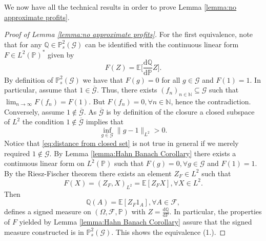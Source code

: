 \documentclass[11pt,a4paper,twoside,openany]{report}
\numberwithin{equation}{section}
\newcommand{\diff}{\mathrm{d}}
\theoremstyle{plain} %
\theoremstyle{definition} %
\theoremstyle{remark} %
\begin{document}
We now have all the technical results in order to prove Lemma \ref{lemma:no approximate profits}.
\begin{proof}[Proof of Lemma \ref{lemma:no approximate profits}]
For the first equivalence, note that for any \(\mathbb{Q}\in\mathbb{P}_s^2(\mathcal{G})\) can be identified with the continuous linear form \(F\in L^2(\mathbb{P})^*\) given by 
\begin{equation*}
    F(Z)=\mathbb{E}\Big[\frac{\diff\mathbb{Q}}{\diff\mathbb{P}}Z\Big].
\end{equation*}
By definition of \(\mathbb{P}_s^2(\mathcal{G})\) we have that \(F(g)=0\) for all \(g\in\mathcal{G}\) and \(F(1)=1\). In particular,  assume that \(1\in\overline{\mathcal{G}}\). Thus, there exists \((f_n)_{n\in\mathbb{N}}\subseteq\mathcal{G}\) such that \(\lim_{n\to\infty}F(f_n)=F(1)\). But \(F(f_n)=0,\forall n\in\mathbb{N}\), hence the contradiction. Conversely, assume \(1\notin\overline{\mathcal{G}}\). As \(\overline{\mathcal{G}}\) is by definition of the closure a closed subspace of \(L^2\) the condition
\(1\notin\overline{\mathcal{G}}\) implies that 
\begin{equation}\label{eq:distance from closed set}
    \inf_{g\in\mathcal{G}}\lVert g-1\rVert_{L^2}>0.
\end{equation}
Notice that \eqref{eq:distance from closed set} is not true in general if we merely required \(1\notin\mathcal{G}\).
By Lemma \ref{lemma:Hahn Banach Corollary} there exists a continuous linear form on \(L^2(\mathbb{P})\) such that \(F(g)=0,\forall g\in\mathcal{G}\) and  \(F(1)=1\). By the Riesz-Fischer theorem there exists an element \(Z_F\in L^2\) such that
\begin{equation*}
    F(X)=(Z_F,X)_{L^2}=\mathbb{E}[Z_FX],\forall X\in L^2.
\end{equation*}
Then 
\begin{equation*}
    \mathbb{Q}(A)=\mathbb{E}[Z_F1_A],\forall A\in\mathcal{F},
\end{equation*}
defines a signed measure on \((\Omega,\mathcal{F},\mathbb{P})\) with \(Z=\frac{\diff \mathbb{Q}}{\diff \mathbb{P}}\). In particular, the properties of \(F\) yielded by Lemma \ref{lemma:Hahn Banach Corollary} assure that the signed measure constructed is in  \(\mathbb{P}_s^2(\mathcal{G})\). This shows the equivalence (1.).


\end{proof}
\end{document}
